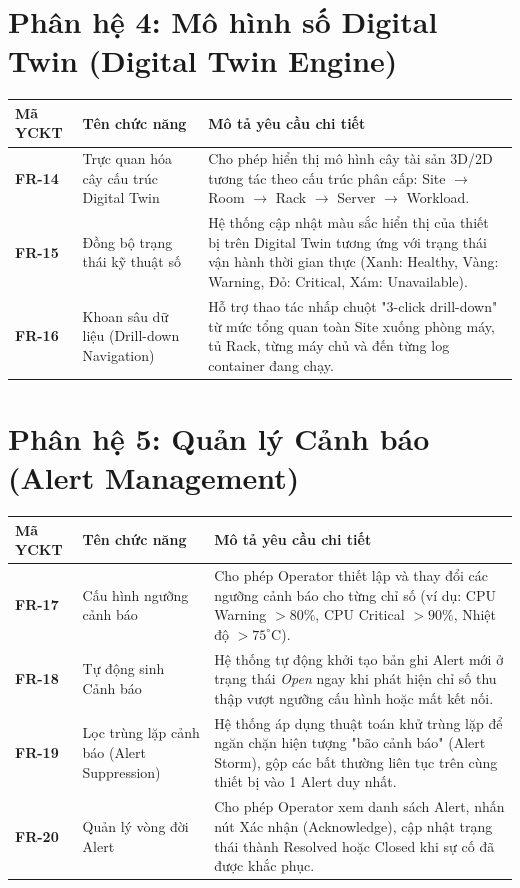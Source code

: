 \section{Phân hệ 4: Mô hình số Digital Twin (Digital Twin Engine)}
\begin{longtable}{|p{2.5cm}|p{4cm}|p{8cm}|}
\hline
\textbf{Mã YCKT} & \textbf{Tên chức năng} & \textbf{Mô tả yêu cầu chi tiết} \\ \hline
\endhead
\textbf{FR-14} & Trực quan hóa cây cấu trúc Digital Twin & Cho phép hiển thị mô hình cây tài sản 3D/2D tương tác theo cấu trúc phân cấp: Site $\rightarrow$ Room $\rightarrow$ Rack $\rightarrow$ Server $\rightarrow$ Workload. \\ \hline
\textbf{FR-15} & Đồng bộ trạng thái kỹ thuật số & Hệ thống cập nhật màu sắc hiển thị của thiết bị trên Digital Twin tương ứng với trạng thái vận hành thời gian thực (Xanh: Healthy, Vàng: Warning, Đỏ: Critical, Xám: Unavailable). \\ \hline
\textbf{FR-16} & Khoan sâu dữ liệu (Drill-down Navigation) & Hỗ trợ thao tác nhấp chuột "3-click drill-down" từ mức tổng quan toàn Site xuống phòng máy, tủ Rack, từng máy chủ và đến từng log container đang chạy. \\ \hline
\end{longtable}

\section{Phân hệ 5: Quản lý Cảnh báo (Alert Management)}
\begin{longtable}{|p{2.5cm}|p{4cm}|p{8cm}|}
\hline
\textbf{Mã YCKT} & \textbf{Tên chức năng} & \textbf{Mô tả yêu cầu chi tiết} \\ \hline
\endhead
\textbf{FR-17} & Cấu hình ngưỡng cảnh báo & Cho phép Operator thiết lập và thay đổi các ngưỡng cảnh báo cho từng chỉ số (ví dụ: CPU Warning $> 80\%$, CPU Critical $> 90\%$, Nhiệt độ $> 75^\circ\text{C}$). \\ \hline
\textbf{FR-18} & Tự động sinh Cảnh báo & Hệ thống tự động khởi tạo bản ghi Alert mới ở trạng thái \textit{Open} ngay khi phát hiện chỉ số thu thập vượt ngưỡng cấu hình hoặc mất kết nối. \\ \hline
\textbf{FR-19} & Lọc trùng lặp cảnh báo (Alert Suppression) & Hệ thống áp dụng thuật toán khử trùng lặp để ngăn chặn hiện tượng "bão cảnh báo" (Alert Storm), gộp các bất thường liên tục trên cùng thiết bị vào 1 Alert duy nhất. \\ \hline
\textbf{FR-20} & Quản lý vòng đời Alert & Cho phép Operator xem danh sách Alert, nhấn nút Xác nhận (Acknowledge), cập nhật trạng thái thành Resolved hoặc Closed khi sự cố đã được khắc phục. \\ \hline
\end{longtable}

